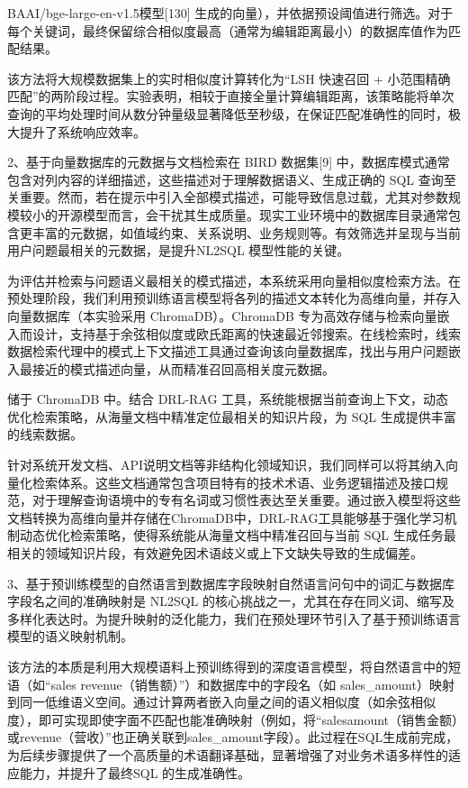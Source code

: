 \documentclass[12pt,a4paper,openright,UTF8]{ctexbook}
\begin{document}
BAAI/bge-large-en-v1.5模型[130] 生成的向量），并依据预设阈值进行筛选。对于每个关键词，最终保留综合相似度最高（通常为编辑距离最小）的数据库值作为匹配结果。


该方法将大规模数据集上的实时相似度计算转化为“LSH 快速召回 + 小范围精确匹配”的两阶段过程。实验表明，相较于直接全量计算编辑距离，该策略能将单次查询的平均处理时间从数分钟量级显著降低至秒级，在保证匹配准确性的同时，极大提升了系统响应效率。


2、基于向量数据库的元数据与文档检索在 BIRD 数据集[9] 中，数据库模式通常包含对列内容的详细描述，这些描述对于理解数据语义、生成正确的 SQL 查询至关重要。然而，若在提示中引入全部模式描述，可能导致信息过载，尤其对参数规模较小的开源模型而言，会干扰其生成质量。现实工业环境中的数据库目录通常包含更丰富的元数据，如值域约束、关系说明、业务规则等。有效筛选并呈现与当前用户问题最相关的元数据，是提升NL2SQL 模型性能的关键。


为评估并检索与问题语义最相关的模式描述，本系统采用向量相似度检索方法。在预处理阶段，我们利用预训练语言模型将各列的描述文本转化为高维向量，并存入向量数据库（本实验采用 ChromaDB）。ChromaDB 专为高效存储与检索向量嵌入而设计，支持基于余弦相似度或欧氏距离的快速最近邻搜索。在线检索时，线索数据检索代理中的模式上下文描述工具通过查询该向量数据库，找出与用户问题嵌入最接近的模式描述向量，从而精准召回高相关度元数据。


储于 ChromaDB 中。结合 DRL-RAG 工具，系统能根据当前查询上下文，动态优化检索策略，从海量文档中精准定位最相关的知识片段，为 SQL 生成提供丰富的线索数据。


针对系统开发文档、API说明文档等非结构化领域知识，我们同样可以将其纳入向量化检索体系。这些文档通常包含项目特有的技术术语、业务逻辑描述及接口规范，对于理解查询语境中的专有名词或习惯性表达至关重要。通过嵌入模型将这些文档转换为高维向量并存储在ChromaDB中，DRL-RAG工具能够基于强化学习机制动态优化检索策略，使得系统能从海量文档中精准召回与当前 SQL 生成任务最相关的领域知识片段，有效避免因术语歧义或上下文缺失导致的生成偏差。


3、基于预训练模型的自然语言到数据库字段映射自然语言问句中的词汇与数据库字段名之间的准确映射是 NL2SQL 的核心挑战之一，尤其在存在同义词、缩写及多样化表达时。为提升映射的泛化能力，我们在预处理环节引入了基于预训练语言模型的语义映射机制。


该方法的本质是利用大规模语料上预训练得到的深度语言模型，将自然语言中的短语（如“sales revenue（销售额）”）和数据库中的字段名（如 sales\_amount）映射到同一低维语义空间。通过计算两者嵌入向量之间的语义相似度（如余弦相似度），即可实现即使字面不匹配也能准确映射（例如，将“salesamount（销售金额）或revenue（营收）”也正确关联到sales\_amount字段）。此过程在SQL生成前完成，为后续步骤提供了一个高质量的术语翻译基础，显著增强了对业务术语多样性的适应能力，并提升了最终SQL 的生成准确性。
\end{document}
